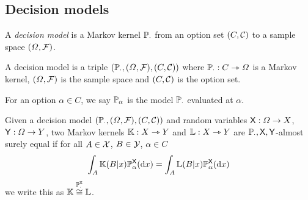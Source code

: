 


\subsection{Decision models}\label{sec:probability_sets}

A \emph{decision model} is a Markov kernel $\mathbb{P}_\cdot$ from an option set $(C,\mathcal{C})$ to a sample space $(\Omega,\mathcal{F})$.

\begin{definition}\label{def:dec_model}
A decision model is a triple $(\mathbb{P}_\cdot, (\Omega,\mathcal{F}), (C,\mathcal{C}))$ where $\mathbb{P}_\cdot:C\rightarrowtriangle \Omega$ is a Markov kernel, $(\Omega,\mathcal{F})$ is the sample space and $(C,\mathcal{C})$ is the option set.
\end{definition}

For an option $\alpha\in C$, we say $\mathbb{P}_\alpha$ is the model $\mathbb{P}_\cdot$ evaluated at $\alpha$.

\begin{definition}
Given a decision model $(\mathbb{P}_\cdot, (\Omega,\mathcal{F}), (C,\mathcal{C}))$ and random variables $\mathsf{X}:\Omega\to X$, $\mathsf{Y}:\Omega\to Y$, two Markov kernels $\mathbb{K}:X\rightarrowtriangle Y$ and $\mathbb{L}:X\rightarrowtriangle Y$ are $\mathbb{P}_\cdot,\mathsf{X},\mathsf{Y}$-almost surely equal if for all $A\in\mathcal{X}$, $B\in \mathcal{Y}$, $\alpha\in C$
\begin{align}
    \int_A \mathbb{K}(B|x)\mathbb{P}_\alpha^{\mathsf{X}}(\mathrm{d}x) = \int_A\mathbb{L}(B|x)\mathbb{P}_\alpha^{\mathsf{X}}(\mathrm{d}x)
\end{align}
we write this as $\mathbb{K}\overset{\mathbb{P}_\cdot^{\mathsf{X}}}{\cong}\mathbb{L}$.
\end{definition}

